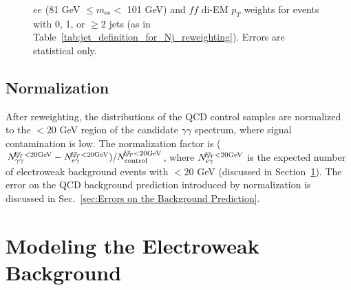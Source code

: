 \documentclass[dissertation.tex]{subfiles}
\begin{document}
\begin{figure}
	\hspace{1cm}
	\caption{$ee$ (81 GeV $\leq m_{\mathrm{ee}} <$ 101 GeV) and $\mathit{ff}$ di-EM $p_{T}$ weights for events with 0, 1, or $\geq 2$ jets (as in Table~\ref{tab:jet_definition_for_Nj_reweighting}).  Errors are statistical only.}
	\label{fig:dijet_pT_weights}
\end{figure}

\subsection{Normalization}
\label{sec:Normalization}

After reweighting, the \MET distributions of the QCD control samples are normalized to the \MET $< 20$ GeV region of the candidate $\gamma\gamma$ \MET spectrum, where signal contamination is low.  The normalization factor is ($N_{\gamma\gamma}^{\not\!\! E_{T} < 20 \mathrm{GeV}} - N_{e\gamma}^{\not\!\! E_{T} < 20 \mathrm{GeV}})/N_{\mathrm{control}}^{\not\!\! E_{T} < 20 \mathrm{GeV}}$, where $N_{e\gamma}^{\not\!\! E_{T} < 20 \mathrm{GeV}}$ is the expected number of electroweak background events with \MET $< 20$ GeV (discussed in Section~\ref{sec:Modeling the Electroweak Background}).  The error on the QCD background prediction introduced by normalization is discussed in Sec.~\ref{sec:Errors on the Background Prediction}.

\section{Modeling the Electroweak Background}
\label{sec:Modeling the Electroweak Background}
\end{document}
